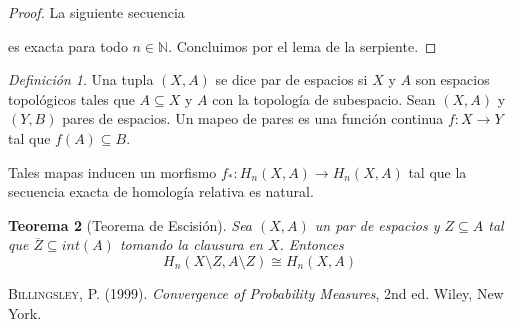\documentclass[aop]{imsart2}
\theoremstyle{plain}
\newtheorem{teo}{Teorema}[section]
\theoremstyle{remark}
\newtheorem{dfn}[teo]{Definición}
\def \N {\mathbb{N}}
\begin{document}
\begin{proof}
    La siguiente secuencia

    \vspace{2mm}
    \centerline{
    }
    \vspace{2mm}
    \noindent es exacta para todo $n\in\N$. Concluimos por el lema de la serpiente.
\end{proof}

\begin{dfn}
    Una tupla $(X,A)$ se dice par de espacios si $X$ y $A$ son espacios topológicos tales que 
    $A\subseteq X$ y $A$ con la topología de subespacio. Sean $(X,A)$ y $(Y,B)$ pares de espacios. 
    Un mapeo de pares es una función continua $f:X\to Y$ tal que $f(A)\subseteq B$.
\end{dfn}

\vspace{2mm}
\noindent Tales mapas inducen un morfismo $f_{*}:H_{n}(X,A)\to H_{n}(X,A)$ tal que la secuencia 
exacta de homología relativa es natural.

\begin{teo}[Teorema de Escisión]
    Sea $(X,A)$ un par de espacios y $Z\subseteq A$ tal que $\overline{Z}\subseteq int(A)$ tomando
    la clausura en $X$. Entonces
    \begin{equation*}
        H_{n}(X\setminus Z,A\setminus Z)\cong H_{n}(X,A)
    \end{equation*}
\end{teo}

\newpage
\begin{thebibliography}{1}
        \textsc{Billingsley, P.} (1999). 
        \textit{Convergence of Probability Measures}, 2nd ed. Wiley, New York.
    \end{thebibliography}
\end{document}

